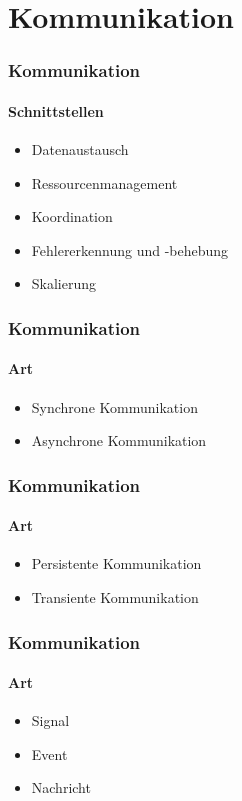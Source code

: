 \section{Kommunikation}
\begin{frame}
  \frametitle{Kommunikation}
  \framesubtitle{Schnittstellen}
  \begin{itemize}
    \item Datenaustausch
    \item Ressourcenmanagement
    \item Koordination
    \item Fehlererkennung und -behebung
    \item Skalierung
  \end{itemize}
\end{frame}

\begin{frame}
  \frametitle{Kommunikation}
  \framesubtitle{Art}
  \begin{itemize}
    \item Synchrone Kommunikation
    \item Asynchrone Kommunikation
  \end{itemize}
\end{frame}

\begin{frame}
  \frametitle{Kommunikation}
  \framesubtitle{Art}
  \begin{itemize}
    \item Persistente Kommunikation
    \item Transiente Kommunikation
  \end{itemize}
\end{frame}

\begin{frame}
  \frametitle{Kommunikation}
  \framesubtitle{Art}
  \begin{itemize}
    \item Signal
    \item Event
    \item Nachricht
  \end{itemize}
\end{frame}